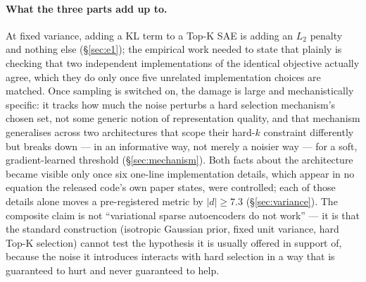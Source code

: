 \documentclass[11pt]{article}
\begin{document}
\paragraph{What the three parts add up to.} At fixed variance, adding a KL
term to a Top-K SAE is adding an $L_2$ penalty and nothing else
(\S\ref{sec:e1}); the empirical work needed to state that plainly is
checking that two independent implementations of the identical objective
actually agree, which they do only once five unrelated implementation
choices are matched. Once sampling is switched on, the damage is large and
mechanistically specific: it tracks how much the noise perturbs a hard
selection mechanism's chosen set, not some generic notion of representation
quality, and that mechanism generalises across two architectures that scope
their hard-$k$ constraint differently but breaks down --- in an informative
way, not merely a noisier way --- for a soft, gradient-learned threshold
(\S\ref{sec:mechanism}). Both facts about the architecture became visible
only once six one-line implementation details, which appear in no equation
the released code's own paper states, were controlled; each of those details
alone moves a pre-registered metric by $|d|\ge7.3$ (\S\ref{sec:variance}).
The composite claim is not ``variational sparse autoencoders do not work''
--- it is that the standard construction (isotropic Gaussian prior, fixed
unit variance, hard Top-K selection) cannot test the hypothesis it is
usually offered in support of, because the noise it introduces interacts
with hard selection in a way that is guaranteed to hurt and never
guaranteed to help.
\end{document}
